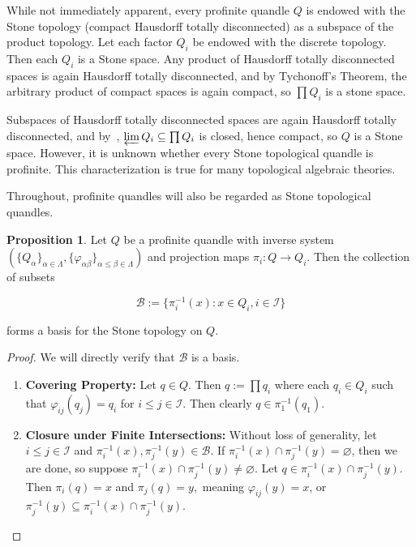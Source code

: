 \documentclass[reqno,dvipsnames]{amsart}
\let\mc\mathcal
\theoremstyle{definition}
\newtheorem{proposition}[theorem]{Proposition}
\begin{document}
{While not immediately apparent, every profinite quandle $Q$ is endowed with the Stone topology (compact Hausdorff totally disconnected) as a subspace of the product topology. Let each factor $Q_i$ be endowed with the discrete topology. Then each $Q_i$ is a Stone space. Any product of Hausdorff totally disconnected spaces is again Hausdorff totally disconnected, and by Tychonoff's Theorem, the arbitrary product of compact spaces is again compact, so $\prod Q_i$ is a stone space. 

Subspaces of Hausdorff totally disconnected spaces are again Hausdorff totally disconnected, and by~\cite[Lemma 1.1.2]{wilson1998profinite}, $\varprojlim Q_i \subseteq \prod Q_i$ is closed, hence compact, so $Q$ is a Stone space. However, it is unknown whether every Stone topological quandle is profinite. This characterization is true for many topological algebraic theories.

Throughout, profinite quandles will also be regarded as Stone topological quandles.

\begin{proposition}
Let $Q$ be a profinite quandle with inverse system $(\{Q_\alpha\}_{\alpha \in \Lambda}, \{\varphi_{\alpha\beta}\}_{\alpha \leq \beta \in \Lambda})$ and projection maps $\pi_i : Q \to Q_i.$ Then the collection of subsets

\[\mc{B} := \{\pi_i^{-1}(x) : x \in Q_i, i \in \mc{I}\}\]

forms a basis for the Stone topology on $Q.$
\end{proposition}

\begin{proof}
We will directly verify that $\mc{B}$ is a basis.
\begin{enumerate}
    \item \textbf{Covering Property:} Let $q \in Q.$ Then $q := \prod q_i$ where each $q_i \in Q_i$ such that $\varphi_{ij}(q_j) = q_i$ for $i \leq j \in \mc{I}.$ Then clearly $q \in \pi_1^{-1}(q_1).$
    \item \textbf{Closure under Finite Intersections:} Without loss of generality, let $i \leq j \in \mc{I}$ and $\pi_i^{-1}(x),\pi_j^{-1}(y) \in \mc{B}$. If $\pi_i^{-1}(x) \cap \pi_j^{-1}(y) = \varnothing$, then we are done, so suppose $\pi_i^{-1}(x) \cap \pi_j^{-1}(y) \neq \varnothing$. Let $q \in \pi_i^{-1}(x) \cap \pi_j^{-1}(y).$ Then $\pi_i(q) = x$ and $\pi_j(q) = y,$ meaning $\varphi_{ij}(y) = x$, or $\pi_j^{-1}(y) \subseteq \pi_i^{-1}(x) \cap \pi_j^{-1}(y).$
\end{enumerate}
\end{proof}

}
\end{document}
